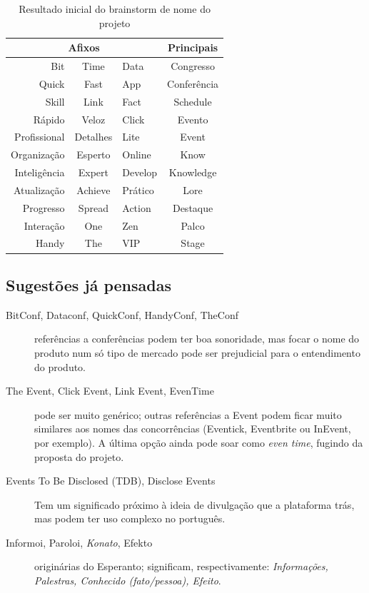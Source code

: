 \documentclass[12pt,a4paper,twoside,hyphens,english,brazil]{abntex2}
\begin{document}
\begin{table}[h]
	\caption{Resultado inicial do brainstorm de nome do projeto}
	\centering
	\begin{tabular}{rcl|c}
		\multicolumn{3}{c|}{\textbf{Afixos}}& \textbf{Principais} \\\hline
		Bit			& Time		& Data		& Congresso		 \\\cline{1-3}
		Quick		& Fast		& App		& Conferência	 \\\cline{1-3}
		Skill		& Link		& Fact		& Schedule		 \\\cline{1-3}
		Rápido		& Veloz		& Click 	& Evento		 \\\cline{1-3}
		Profissional& Detalhes	& Lite		& Event			 \\\cline{1-3}
		Organização	& Esperto	& Online	& Know			 \\\cline{1-3}
		Inteligência& Expert	& Develop	& Knowledge		 \\\cline{1-3}
		Atualização	& Achieve	& Prático	& Lore			 \\\cline{1-3}
		Progresso	& Spread	& Action	& Destaque		 \\\cline{1-3}
		Interação	& One		& Zen		& Palco			 \\\cline{1-3}
		Handy		& The		& VIP		& Stage			
	\end{tabular}
	\label{tab:nomes}
\end{table}

\subsection*{Sugestões já pensadas}
\begin{description}
	\item[BitConf, Dataconf, QuickConf, HandyConf, TheConf] referências a conferências podem ter boa sonoridade, mas focar o nome do produto num só tipo de mercado pode ser prejudicial para o entendimento do produto.
	\item[The Event, Click Event, Link Event, EvenTime] pode ser muito genérico; outras referências a Event podem ficar muito similares aos nomes das concorrências (Eventick, Eventbrite ou InEvent, por exemplo). A última opção ainda pode soar como \emph{even time}, fugindo da proposta do projeto.
	\item[Events To Be Disclosed (TDB), Disclose Events] Tem um significado próximo à ideia de divulgação que a plataforma trás, mas podem ter uso complexo no português.
	\item[Informoi, Paroloi, \emph{Konato}, Efekto] originárias do Esperanto; significam, respectivamente: \emph{Informações, Palestras, Conhecido (fato/pessoa), Efeito}.
\end{description}
\end{document}
